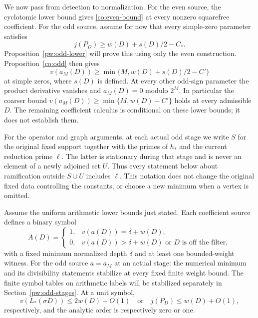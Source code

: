 We now pass from detection to normalization.  For the even source,
the cyclotomic lower bound gives \eqref{co:even-bound} at every
nonzero squarefree coefficient.  For the odd source, assume for now
that every simple-zero parameter satisfies
\[
 j(P_D)\geq w(D)+s(D)/2-C_*.
\]
Proposition~\ref{pw:odd-lower} will prove this using only the even
construction.  Proposition~\ref{co:odd} then gives
\[
 v(a_M(D))\geq\min\{M,w(D)+s(D)/2-C'\}
\]
at simple zeros, where $s(D)$ is defined.  At every other odd-sign
parameter the product derivative vanishes and $a_M(D)=0$ modulo
$2^M$.  In particular the coarser bound
$v(a_M(D))\geq\min\{M,w(D)-C'\}$ holds at every admissible $D$.
The remaining coefficient calculus is conditional on these lower
bounds; it does not establish them.

For the operator and graph arguments, at each actual odd stage we
write $S$ for the original fixed support together with the primes of
$h_*$ and the current reduction prime $\ell$.  The latter is stationary
during that stage and is never an element of a newly adjoined set
$U$.  Thus every statement below about ramification outside $S\cup U$
includes $\ell$.  This notation does not change the original fixed
data controlling the constants, or choose a new minimum when a vertex
is omitted.

\begin{lemma}\label{co:minimum}
Assume the uniform arithmetic lower bounds just stated.  Each coefficient source
defines a binary symbol
\begin{equation}\label{co:symbol}
 A(D)=\begin{cases}
 1,&v(a(D))=\delta+w(D),\\
 0,&v(a(D))>\delta+w(D)\text{ or }D\text{ is off the filter},
 \end{cases}
\end{equation}
with a fixed minimum normalized depth $\delta$ and at least one
bounded-weight witness.  For the odd source $a=a_M$ at an actual stage:
the numerical minimum and its divisibility statements stabilize at
every fixed finite weight bound.  The finite symbol tables on arithmetic
labels will be stabilized separately in Section~\ref{pw:odd-stages}.
At a unit symbol,
\[
 v(L_*(\sigma D))\leq2w(D)+O(1)
 \quad\text{or}\quad j(P_D)\leq w(D)+O(1),
\]
respectively, and the analytic order is respectively zero or one.
\end{lemma}


